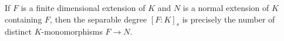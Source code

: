 If $F$ is a finite dimensional extension of $K$ and $N$ is a normal extension of $K$ containing $F$, then the separable degree $[F : K]_s$ is precisely the number of distinct $K$-monomorphisms $F \to N$.
